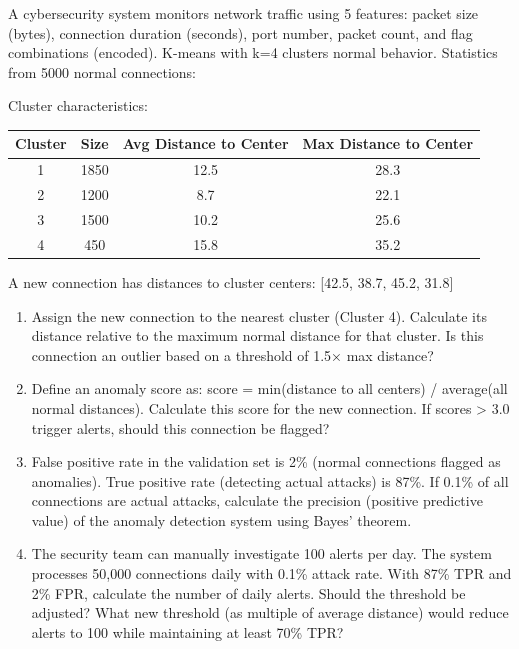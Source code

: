 \documentclass[12pt]{article}
\begin{document}
A cybersecurity system monitors network traffic using 5 features: packet size (bytes), connection duration (seconds), port number, packet count, and flag combinations (encoded). K-means with k=4 clusters normal behavior. Statistics from 5000 normal connections:

Cluster characteristics:
\begin{center}
\begin{tabular}{cccc}
\toprule
Cluster & Size & Avg Distance to Center & Max Distance to Center \\
\midrule
1 & 1850 & 12.5 & 28.3 \\
2 & 1200 & 8.7 & 22.1 \\
3 & 1500 & 10.2 & 25.6 \\
4 & 450 & 15.8 & 35.2 \\
\bottomrule
\end{tabular}
\end{center}

A new connection has distances to cluster centers: [42.5, 38.7, 45.2, 31.8]

\begin{enumerate}[label=(\alph*)]
\item Assign the new connection to the nearest cluster (Cluster 4). Calculate its distance relative to the maximum normal distance for that cluster. Is this connection an outlier based on a threshold of 1.5× max distance?

\item Define an anomaly score as: score = min(distance to all centers) / average(all normal distances). Calculate this score for the new connection. If scores > 3.0 trigger alerts, should this connection be flagged?

\item False positive rate in the validation set is 2\% (normal connections flagged as anomalies). True positive rate (detecting actual attacks) is 87\%. If 0.1\% of all connections are actual attacks, calculate the precision (positive predictive value) of the anomaly detection system using Bayes' theorem.

\item The security team can manually investigate 100 alerts per day. The system processes 50,000 connections daily with 0.1\% attack rate. With 87\% TPR and 2\% FPR, calculate the number of daily alerts. Should the threshold be adjusted? What new threshold (as multiple of average distance) would reduce alerts to 100 while maintaining at least 70\% TPR?
\end{enumerate}
\end{document}
